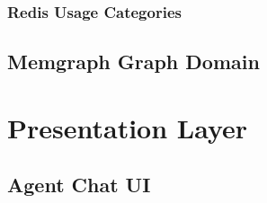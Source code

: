 \documentclass[a4paper,twoside]{sapthesis}
\begin{document}
\subsubsection{Redis Usage Categories}
%
%
%
%
%
%
%
%
%
%
%

\subsection{Memgraph Graph Domain}

\section{Presentation Layer}
\label{sec:presentation-layer}

\subsection{Agent Chat UI}
\end{document}
